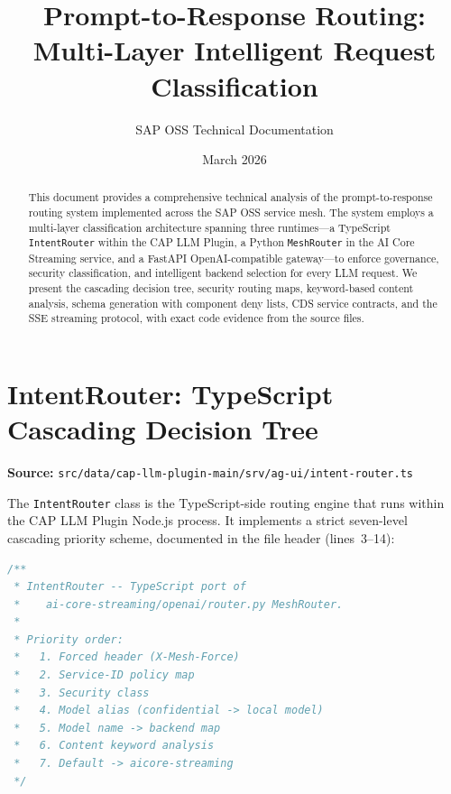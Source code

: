 \documentclass[11pt]{article}
\title{Prompt-to-Response Routing:\\Multi-Layer Intelligent Request Classification}
\author{SAP OSS Technical Documentation}
\date{March 2026}
\begin{document}
\maketitle

\begin{abstract}
This document provides a comprehensive technical analysis of the prompt-to-response
routing system implemented across the SAP OSS service mesh. The system employs a
multi-layer classification architecture spanning three runtimes---a TypeScript
\texttt{IntentRouter} within the CAP LLM Plugin, a Python \texttt{MeshRouter}
in the AI Core Streaming service, and a FastAPI OpenAI-compatible gateway---to
enforce governance, security classification, and intelligent backend selection
for every LLM request. We present the cascading decision tree, security routing
maps, keyword-based content analysis, schema generation with component deny lists,
CDS service contracts, and the SSE streaming protocol, with exact code evidence
from the source files.
\end{abstract}

\tableofcontents
\newpage

\section{IntentRouter: TypeScript Cascading Decision Tree}
\label{sec:intent-router}

\noindent\textbf{Source:}
\texttt{src/data/cap-llm-plugin-main/srv/ag-ui/intent-router.ts}

The \texttt{IntentRouter} class is the TypeScript-side routing engine that runs
within the CAP LLM Plugin Node.js process. It implements a strict seven-level
cascading priority scheme, documented in the file header (lines~3--14):

\begin{lstlisting}[language=TypeScript,caption={Priority order comment (intent-router.ts, lines 3--14)},firstnumber=3]
/**
 * IntentRouter -- TypeScript port of
 *    ai-core-streaming/openai/router.py MeshRouter.
 *
 * Priority order:
 *   1. Forced header (X-Mesh-Force)
 *   2. Service-ID policy map
 *   3. Security class
 *   4. Model alias (confidential -> local model)
 *   5. Model name -> backend map
 *   6. Content keyword analysis
 *   7. Default -> aicore-streaming
 */
\end{lstlisting}
\end{document}
